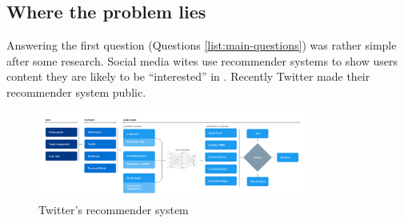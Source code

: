 \newpage
\subsection{Where the problem lies}
Answering the first question (Questions \ref{list:main-questions}) was rather simple after some research.
Social media wites use recommender systems to
show users content they are likely to be ``interested'' in \cite{twitter-rec}. Recently Twitter made their recommender system public.
\begin{figure}[hbtp]
    \centering
    \includegraphics[width=0.8\textwidth]{../images/twitter-recommender.png}
    \caption{Twitter's recommender system}
    \label{fig:twitter-recommender}
\end{figure}

